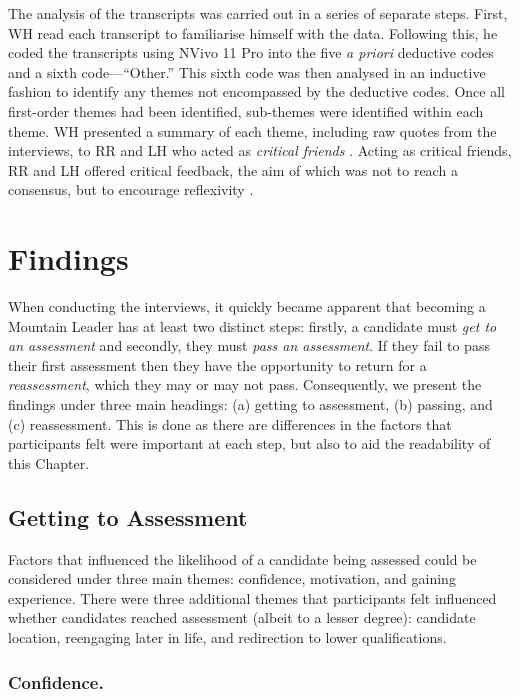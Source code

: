 \documentclass[
  12pt,
  a4paper,
]{book}
\begin{document}
The analysis of the transcripts was carried out in a series of separate steps. First, WH read each transcript to familiarise himself with the data. Following this, he coded the transcripts using NVivo 11 Pro \citep{QSR2017} into the five \emph{a priori} deductive codes and a sixth code---``Other.'' This sixth code was then analysed in an inductive fashion to identify any themes not encompassed by the deductive codes. Once all first-order themes had been identified, sub-themes were identified within each theme. WH presented a summary of each theme, including raw quotes from the interviews, to RR and LH who acted as \emph{critical friends} \citep[cf.~][]{Sparkes2014, Smith2018a}. Acting as critical friends, RR and LH offered critical feedback, the aim of which was not to reach a consensus, but to encourage reflexivity \citep{Smith2018a}.

\hypertarget{findings}{%
\section{Findings}\label{findings}}

When conducting the interviews, it quickly became apparent that becoming a Mountain Leader has at least two distinct steps: firstly, a candidate must \emph{get to an assessment} and secondly, they must \emph{pass an assessment}. If they fail to pass their first assessment then they have the opportunity to return for a \emph{reassessment}, which they may or may not pass. Consequently, we present the findings under three main headings: (a) getting to assessment, (b) passing, and (c) reassessment. This is done as there are differences in the factors that participants felt were important at each step, but also to aid the readability of this Chapter.

\hypertarget{qual-gta}{%
\subsection{Getting to Assessment}\label{qual-gta}}

Factors that influenced the likelihood of a candidate being assessed could be considered under three main themes: confidence, motivation, and gaining experience. There were three additional themes that participants felt influenced whether candidates reached assessment (albeit to a lesser degree): candidate location, reengaging later in life, and redirection to lower qualifications.

\hypertarget{qual-gta-confidence}{%
\subsubsection{Confidence.}\label{qual-gta-confidence}}
\end{document}
